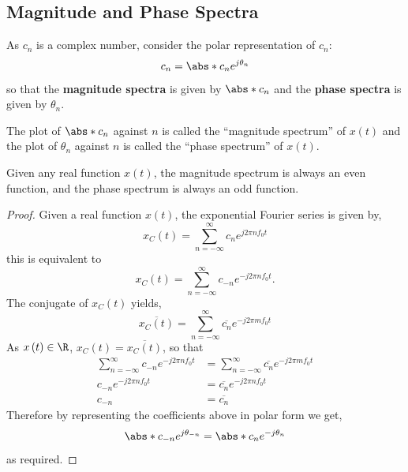 \documentclass{article}
\begin{document}
\subsection{Magnitude and Phase Spectra}
As \(c_n\) is a complex number, consider the polar representation of
\(c_n\):
\begin{equation*}
    c_n = \abs*{c_n} e^{j \theta_n}
\end{equation*}
so that the \textbf{magnitude spectra} is given by \(\abs*{c_n}\) and the \textbf{phase spectra} is given by \(\theta_n\).

The plot of \(\abs*{c_n}\) against \(n\) is called the ``magnitude
spectrum'' of \(x\left( t \right)\) and the plot of \(\theta_n\)
against \(n\) is called the ``phase spectrum'' of \(x\left( t
\right)\).
\begin{theorem}
    Given any real function \(x\left( t \right)\), the magnitude spectrum is always an even function,
    and the phase spectrum is always an odd function.
\end{theorem}
\begin{proof}
    Given a real function \(x\left( t \right)\), the exponential Fourier series is given by,
    \begin{equation*}
        x_C\left( t \right) = \sum_{n = -\infty}^\infty c_n e^{j 2\pi n f_0 t}
    \end{equation*}
    this is equivalent to
    \begin{equation*}
        x_C\left( t \right) = \sum_{n = -\infty}^\infty c_{-n} e^{-j 2\pi n f_0 t}.
    \end{equation*}
    The conjugate of \(x_C\left( t \right)\) yields,
    \begin{equation*}
        \overline{x_C\left( t \right)} = \sum_{n = -\infty}^\infty \overline{c_{n}} e^{-j 2\pi m f_0 t}
    \end{equation*}
    As \(x\left( t \right) \in \R\), \(x_C\left( t \right) = \overline{x_C\left( t \right)}\), so that
    \begin{align*}
        \sum_{n = -\infty}^\infty c_{-n} e^{-j 2\pi n f_0 t} & = \sum_{n = -\infty}^\infty \overline{c_{n}} e^{-j 2\pi m f_0 t} \\
        c_{-n} e^{-j 2\pi n f_0 t}                           & = \overline{c_n} e^{-j 2\pi n f_0 t}                             \\
        c_{-n}                                               & = \overline{c_n}
    \end{align*}
    Therefore by representing the coefficients above in polar form we get,
    \begin{equation*}
        \abs*{c_{-n}} e^{j \theta_{-n}} = \abs*{c_n} e^{-j \theta_n}
    \end{equation*}
    as required.
\end{proof}
\end{document}
